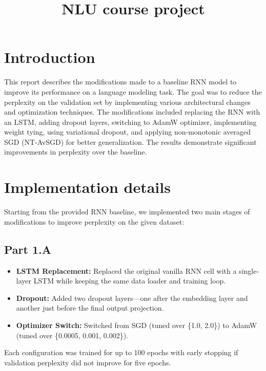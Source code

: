 \documentclass[a4paper]{article}
\title{NLU course project}
\begin{document}
\maketitle


\section{Introduction}
This report describes the modifications made to a baseline RNN model to improve its performance on a language modeling task. The goal was to reduce the perplexity on the validation set by implementing various architectural changes and optimization techniques. The modifications included replacing the RNN with an LSTM, adding dropout layers, switching to AdamW optimizer, implementing weight tying, using variational dropout, and applying non-monotonic averaged SGD (NT-AvSGD) for better generalization. The results demonstrate significant improvements in perplexity over the baseline.

\section{Implementation details}
Starting from the provided RNN baseline, we implemented two main stages of modifications to improve perplexity on the given dataset:

\subsection{Part 1.A}
\begin{itemize}
  \item \textbf{LSTM Replacement:} Replaced the original vanilla RNN cell with a single‐layer LSTM while keeping the same data loader and training loop.
  \item \textbf{Dropout:} Added two dropout layers—one after the embedding layer and another just before the final output projection.
  \item \textbf{Optimizer Switch:} Switched from SGD (tuned over \{1.0, 2.0\}) to AdamW (tuned over \{0.0005, 0.001, 0.002\}).
\end{itemize}
Each configuration was trained for up to 100 epochs with early stopping if validation perplexity did not improve for five epochs.
\end{document}

